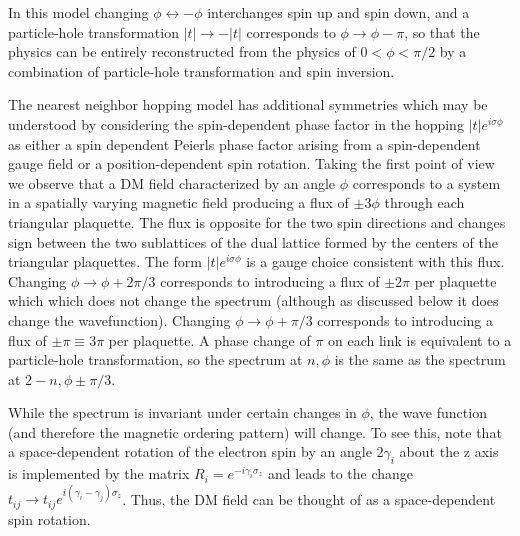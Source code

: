 \documentclass[%
reprint,
superscriptaddress,
twocolumn,
 amsmath,amssymb,
 aps,
 prb,
]{revtex4-2}
\begin{document}
In this model changing $\phi \leftrightarrow -\phi$ interchanges spin up and spin down, and a particle-hole transformation $|t|\rightarrow -|t|$ corresponds to $\phi\rightarrow \phi-\pi$, so that  the physics  can be entirely reconstructed from the physics of $0<\phi<\pi/2$ by a combination of particle-hole transformation and spin inversion.

The nearest neighbor hopping model has additional symmetries which may be understood by considering the spin-dependent phase factor in the hopping $|t|e^{i\sigma \phi}$ as  either a spin dependent Peierls phase factor arising from a spin-dependent gauge field or a position-dependent spin rotation.  Taking the first point of view we observe that a DM field characterized by an angle $\phi$ corresponds to a system in a spatially varying magnetic field producing a flux of $\pm 3\phi$ through each triangular plaquette.  The flux is opposite for the two spin directions and changes sign between the two sublattices of the dual lattice formed by the centers of the triangular plaquettes.  The form $|t|e^{i\sigma\phi}$ is a gauge choice consistent with this flux. Changing $\phi\rightarrow\phi+2\pi/3$ corresponds to introducing a flux of $\pm 2\pi$ per plaquette which which does not change the spectrum (although as discussed below it does change the wavefunction). Changing $\phi\rightarrow\phi+\pi/3$ corresponds to introducing a flux of $\pm \pi\equiv 3\pi$ per plaquette. A phase change of $\pi$ on each link is equivalent to a particle-hole transformation, so the spectrum at $n,\phi$ is the same as the spectrum at $2-n,\phi\pm \pi/3$. 


While the spectrum is invariant under certain changes in $\phi$, the wave function (and therefore the magnetic ordering pattern) will change. To see this, note that a space-dependent rotation of the electron spin by an angle $2\gamma_i$ about the z axis is implemented by the matrix $R_i=e^{-i\gamma_i\sigma_z}$ and leads to the change $t_{ij}\rightarrow t_{ij}e^{i(\gamma_i-\gamma_j)\sigma_z}$. Thus, the DM field can be thought of as a space-dependent spin rotation.  
\end{document}
